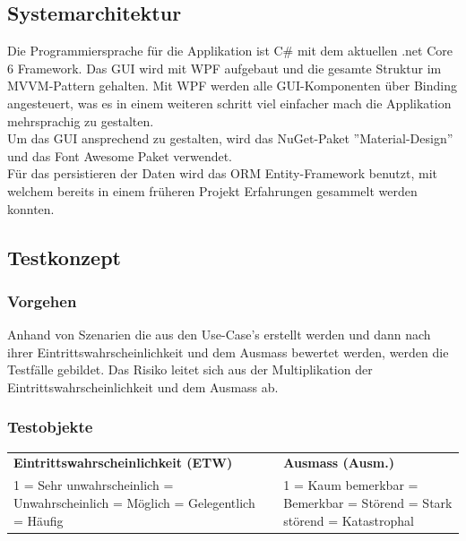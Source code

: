 \subsection{Systemarchitektur}
Die Programmiersprache für die Applikation ist C\# mit dem aktuellen .net Core 6 Framework. Das GUI wird mit WPF aufgebaut und die gesamte Struktur im MVVM-Pattern gehalten. Mit WPF werden alle GUI-Komponenten über Binding angesteuert, was es in einem weiteren schritt viel einfacher mach die Applikation mehrsprachig zu gestalten.\\ Um das GUI ansprechend zu gestalten, wird das NuGet-Paket ''Material-Design'' und das Font Awesome Paket verwendet.\\
Für das persistieren der Daten wird das ORM Entity-Framework benutzt, mit welchem bereits in einem früheren Projekt Erfahrungen gesammelt werden konnten.

\newpage
\subsection{Testkonzept} \label{testkonzept}
\subsubsection{Vorgehen}
Anhand von Szenarien die aus den Use-Case's erstellt werden und dann nach ihrer Eintrittswahrscheinlichkeit und dem Ausmass bewertet werden, werden die Testfälle gebildet. Das Risiko leitet sich aus der Multiplikation der Eintrittswahrscheinlichkeit und dem Ausmass ab.
\subsubsection{Testobjekte}
\begin{table}[H]
  \centering
  \setlength\extrarowheight{2pt}
  \begin{tabulary}{1.0\textwidth}{LCL}
    \textbf{Eintrittswahrscheinlichkeit (ETW)} & &
    \textbf{Ausmass (Ausm.)} \\
    1 = Sehr unwahrscheinlich = Unwahrscheinlich = Möglich = Gelegentlich = Häufig && 1 = Kaum bemerkbar = Bemerkbar  = Störend  = Stark störend  = Katastrophal\\
  \end{tabulary}
\end{table}

